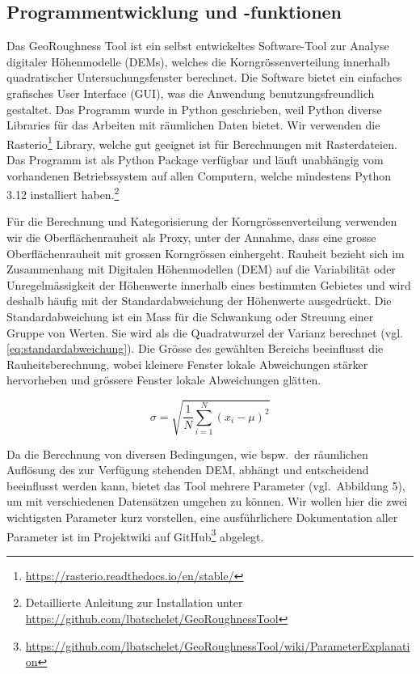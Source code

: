 \documentclass[12pt]{article}
\begin{document}
    \subsection{Programmentwicklung und -funktionen}\label{subsec:programmentwicklung-und--funktionen}

        Das GeoRoughness Tool ist ein selbst entwickeltes Software-Tool zur Analyse digitaler Höhenmodelle (DEMs), welches die Korngrössenverteilung innerhalb quadratischer Untersuchungsfenster berechnet.
        Die Software bietet ein einfaches grafisches User Interface (GUI), was die Anwendung benutzungsfreundlich gestaltet. 
        Das Programm wurde in Python geschrieben, weil Python diverse Libraries für das Arbeiten mit räumlichen Daten bietet. 
        Wir verwenden die Rasterio\footnote{\href{https://rasterio.readthedocs.io/en/stable/}{https://rasterio.readthedocs.io/en/stable/}} Library, welche gut geeignet ist für Berechnungen mit Rasterdateien.
        Das Programm ist als Python Package verfügbar und läuft unabhängig vom vorhandenen Betriebssystem auf allen Computern, welche mindestens Python 3.12 installiert haben.\footnote{Detaillierte Anleitung zur Installation unter \href{https://github.com/lbatschelet/GeoRoughness-Tool}{https://github.com/lbatschelet/GeoRoughness\-Tool}}

        Für die Berechnung und Kategorisierung der Korngrössenverteilung verwenden wir die Oberflächenrauheit als Proxy, unter der Annahme, dass eine grosse Oberflächenrauheit mit grossen Korngrössen einhergeht.
        Rauheit bezieht sich im Zusammenhang mit Digitalen Höhenmodellen (DEM) auf die Variabilität oder Unregelmässigkeit der Höhenwerte innerhalb eines bestimmten Gebietes und wird deshalb häufig mit der Standardabweichung der Höhenwerte ausgedrückt.
        Die Standardabweichung ist ein Mass für die Schwankung oder Streuung einer Gruppe von Werten.
        Sie wird als die Quadratwurzel der Varianz berechnet (vgl. \ref{eq:standardabweichung}).
        Die Grösse des gewählten Bereichs beeinflusst die Rauheitsberechnung, wobei kleinere Fenster lokale Abweichungen stärker hervorheben und grössere Fenster lokale Abweichungen glätten.

        \begin{equation}
            \sigma = \sqrt{\frac{1}{N} \sum_{i=1}^{N} (x_i - \mu)^2}
            \label{eq:standardabweichung}
        \end{equation}

        Da die Berechnung von diversen Bedingungen, wie bspw.\ der räumlichen Auflösung des zur Verfügung stehenden DEM, abhängt und entscheidend beeinflusst werden kann, bietet das Tool mehrere Parameter (vgl.\ Abbildung 5), um mit verschiedenen Datensätzen umgehen zu können. 
        Wir wollen hier die zwei wichtigsten Parameter kurz vorstellen, eine ausführlichere Dokumentation aller Parameter ist im Projektwiki auf GitHub\footnote{\href{https://github.com/lbatschelet/GeoRoughness-Tool/wiki/Parameter-Explanation}{https://github.com/lbatschelet/GeoRoughness\-Tool/wiki/Parameter\-Explanation}} abgelegt.
\end{document}
